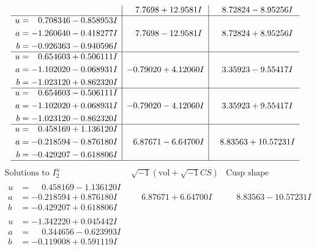 \documentclass[1p]{elsarticle_modified}
\theoremstyle{definition}
\newcommand{\I}{\sqrt{-1}}
\begin{document}
$$\begin{array}{c|c|c}
 & \phantom{-}7.7698 + 12.9581 I & \phantom{-}8.72824 - 8.95256 I \\ \hline\begin{aligned}
u &= \phantom{-}0.708346 - 0.858953 I \\
a &= -1.260640 - 0.418277 I \\
b &= -0.926363 - 0.940596 I\end{aligned}
 & \phantom{-}7.7698 - 12.9581 I & \phantom{-}8.72824 + 8.95256 I \\ \hline\begin{aligned}
u &= \phantom{-}0.654603 + 0.506111 I \\
a &= -1.102020 - 0.068931 I \\
b &= -1.023120 + 0.862320 I\end{aligned}
 & -0.79020 + 4.12060 I & \phantom{-}3.35923 - 9.55417 I \\ \hline\begin{aligned}
u &= \phantom{-}0.654603 - 0.506111 I \\
a &= -1.102020 + 0.068931 I \\
b &= -1.023120 - 0.862320 I\end{aligned}
 & -0.79020 - 4.12060 I & \phantom{-}3.35923 + 9.55417 I \\ \hline\begin{aligned}
u &= \phantom{-}0.458169 + 1.136120 I \\
a &= -0.218594 - 0.876180 I \\
b &= -0.429207 - 0.618806 I\end{aligned}
 & \phantom{-}6.87671 - 6.64700 I & \phantom{-}8.83563 + 10.57231 I\\
 \hline 
 \end{array}$$\newpage$$\begin{array}{c|c|c}  
\text{Solutions to }I^u_{2}& \I (\text{vol} + \sqrt{-1}CS) & \text{Cusp shape}\\
 \hline 
\begin{aligned}
u &= \phantom{-}0.458169 - 1.136120 I \\
a &= -0.218594 + 0.876180 I \\
b &= -0.429207 + 0.618806 I\end{aligned}
 & \phantom{-}6.87671 + 6.64700 I & \phantom{-}8.83563 - 10.57231 I \\ \hline\begin{aligned}
u &= -1.342220 + 0.045442 I \\
a &= \phantom{-}0.344656 - 0.623993 I \\
b &= -0.119008 + 0.591119 I\end{aligned}

\end{array}$$
\end{document}
